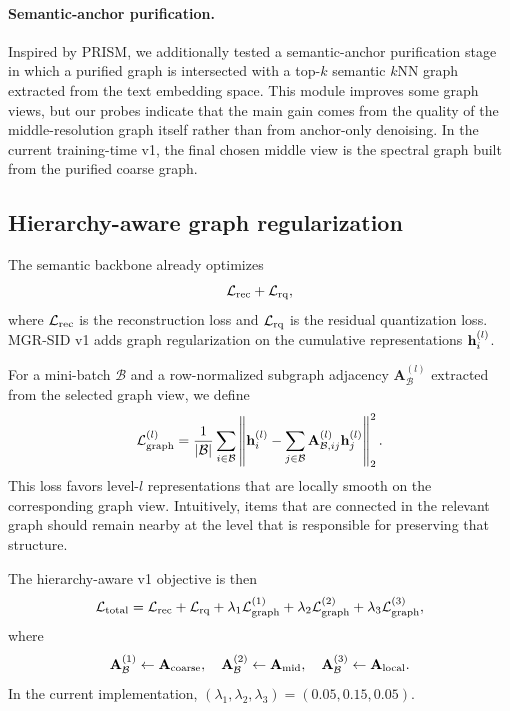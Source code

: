 \paragraph{Semantic-anchor purification.}
Inspired by PRISM, we additionally tested a semantic-anchor purification stage in which a purified graph is intersected with a top-$k$ semantic $k$NN graph extracted from the text embedding space. This module improves some graph views, but our probes indicate that the main gain comes from the quality of the middle-resolution graph itself rather than from anchor-only denoising. In the current training-time v1, the final chosen middle view is the spectral graph built from the purified coarse graph.

\subsection{Hierarchy-aware graph regularization}

The semantic backbone already optimizes
\begin{equation}
\mathcal{L}_{\mathrm{rec}} + \mathcal{L}_{\mathrm{rq}},
\end{equation}
where $\mathcal{L}_{\mathrm{rec}}$ is the reconstruction loss and $\mathcal{L}_{\mathrm{rq}}$ is the residual quantization loss. MGR-SID v1 adds graph regularization on the cumulative representations $\mathbf{h}_i^{(l)}$.

For a mini-batch $\mathcal{B}$ and a row-normalized subgraph adjacency $\mathbf{A}_{\mathcal{B}}^{(l)}$ extracted from the selected graph view, we define
\begin{equation}
\mathcal{L}_{\mathrm{graph}}^{(l)} =
\frac{1}{|\mathcal{B}|}
\sum_{i \in \mathcal{B}}
\left\|
\mathbf{h}_i^{(l)} -
\sum_{j \in \mathcal{B}} \mathbf{A}^{(l)}_{\mathcal{B},ij} \mathbf{h}_j^{(l)}
\right\|_2^2 .
\label{eq:graph_smooth}
\end{equation}
This loss favors level-$l$ representations that are locally smooth on the corresponding graph view. Intuitively, items that are connected in the relevant graph should remain nearby at the level that is responsible for preserving that structure.

The hierarchy-aware v1 objective is then
\begin{equation}
\mathcal{L}_{\mathrm{total}} =
\mathcal{L}_{\mathrm{rec}} + \mathcal{L}_{\mathrm{rq}}
 + \lambda_1 \mathcal{L}_{\mathrm{graph}}^{(1)}
 + \lambda_2 \mathcal{L}_{\mathrm{graph}}^{(2)}
 + \lambda_3 \mathcal{L}_{\mathrm{graph}}^{(3)},
\end{equation}
where
\begin{equation}
\mathbf{A}^{(1)}_{\mathcal{B}} \leftarrow \mathbf{A}_{\mathrm{coarse}},\quad
\mathbf{A}^{(2)}_{\mathcal{B}} \leftarrow \mathbf{A}_{\mathrm{mid}},\quad
\mathbf{A}^{(3)}_{\mathcal{B}} \leftarrow \mathbf{A}_{\mathrm{local}} .
\end{equation}
In the current implementation, $(\lambda_1,\lambda_2,\lambda_3) = (0.05, 0.15, 0.05)$.

